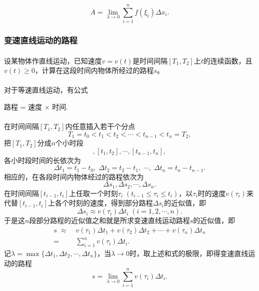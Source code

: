 \begin{equation*}
  A = \lim_{\lambda \to 0}\sum_{i=1}^nf(\xi_i)\Delta x_i.
\end{equation*}

\subsubsection{变速直线运动的路程}
\paragraph{}
设某物体作直线运动，已知速度$v=v(t)$是时间间隔$[T_1,T_2]$上$t$的连续函数，且$v(t) \geq 0$，计算在这段时间内物体所经过的路程$s$。

\paragraph{}
对于等速直线运动，有公式
\begin{center}
  路程 = 速度 $\times$ 时间.
\end{center}

\paragraph{}
在时间间隔$[T_1,T_2]$内任意插入若干个分点
\begin{equation*}
  T_1 = t_0 < t_1 < t_2 < \cdots < t_{n-1} < t_n = T_2,
\end{equation*}
把$[T_1,T_2]$分成$n$个小时段
\begin{equation*}
  [t_0,t_1], [t_1, t_2], \cdots, [t_{n-1}, t_n],
\end{equation*}
各小时段时间的长依次为
\begin{equation*}
  \Delta t_1 = t_1 - t_0, \; \Delta t_2 = t_2 - t_1, \; \cdots, \; \Delta t_n = t_n - t_{n-1}.
\end{equation*}
相应的，在各段时间内物体经过的路程依次为
\begin{equation*}
  \Delta s_1, \Delta s_2, \cdots, \Delta s_n.
\end{equation*}
在时间间隔$[t_{i-1}, t_i]$上任取一个时刻$\tau_i \;(t_{i-1} \leq \tau_i \leq t_i)$，以$\tau_i$时的速度$v(\tau_i)$来代替$[t_{i-1}, t_i]$上各个时刻的速度，得到部分路程$\Delta s_i$的近似值，即
\begin{equation*}
  \Delta s_i \approx v(\tau_i)\Delta t_i \; (i=1,2,\cdots,n).
\end{equation*}
于是这$n$段部分路程的近似值之和就是所求变速直线运动路程$s$的近似值，即
\begin{align*}
  s \;\approx&\; v(\tau_1)\Delta t_1 + v(\tau_2)\Delta t_2 + \cdots + v(\tau_n)\Delta t_n \\
  =&\; \sum_{i=1}^nv(\tau_i)\Delta t_i.
\end{align*}
记$\lambda = \max\{\Delta t_1, \Delta t_2, \cdots, \Delta t_n\}$，当$\lambda \to 0$时，取上述和式的极限，即得变速直线运动的路程
\begin{equation*}
  s = \lim_{\lambda \to 0}\sum_{i=1}^nv(\tau_i)\Delta t_i.
\end{equation*}

